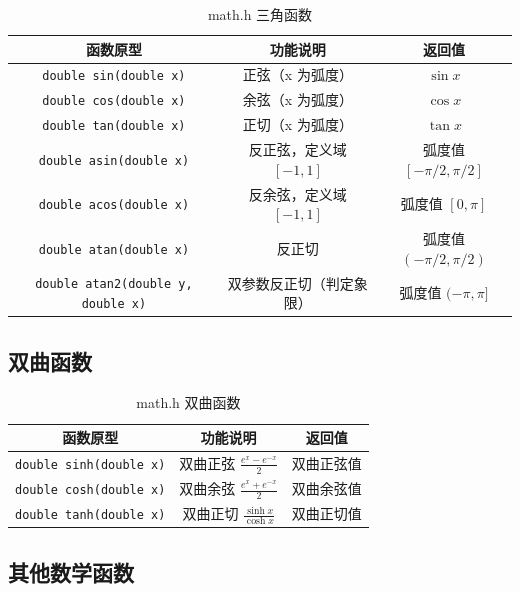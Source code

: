 \begin{table}[H]
\centering
\small
\renewcommand{\arraystretch}{1.6}
\begin{tabulary}{\linewidth}{CCC}
\toprule
\textbf{函数原型} & \textbf{功能说明} & \textbf{返回值} \\ \midrule
\texttt{double sin(double x)} & 正弦（x 为弧度） & $\sin x$ \\ 
\texttt{double cos(double x)} & 余弦（x 为弧度） & $\cos x$ \\ 
\texttt{double tan(double x)} & 正切（x 为弧度） & $\tan x$ \\ 
\texttt{double asin(double x)} & 反正弦，定义域 $[-1, 1]$ & 弧度值 $[-\pi/2, \pi/2]$ \\ 
\texttt{double acos(double x)} & 反余弦，定义域 $[-1, 1]$ & 弧度值 $[0, \pi]$ \\ 
\texttt{double atan(double x)} & 反正切 & 弧度值 $(-\pi/2, \pi/2)$ \\ 
\texttt{double atan2(double y, double x)} & 双参数反正切（判定象限） & 弧度值 $(-\pi, \pi]$ \\ \bottomrule
\end{tabulary}
\caption{math.h 三角函数}
\label{tab:math_trig}
\end{table}

\subsection{双曲函数}

\begin{table}[H]
\centering
\small
\renewcommand{\arraystretch}{1.5}
\begin{tabulary}{\linewidth}{CCC}
\toprule
\textbf{函数原型} & \textbf{功能说明} & \textbf{返回值} \\ \midrule
\texttt{double sinh(double x)} & 双曲正弦 $\frac{e^x - e^{-x}}{2}$ & 双曲正弦值 \\ 
\texttt{double cosh(double x)} & 双曲余弦 $\frac{e^x + e^{-x}}{2}$ & 双曲余弦值 \\ 
\texttt{double tanh(double x)} & 双曲正切 $\frac{\sinh x}{\cosh x}$ & 双曲正切值 \\ \bottomrule
\end{tabulary}
\caption{math.h 双曲函数}
\label{tab:math_hyper}
\end{table}

\subsection{其他数学函数}


